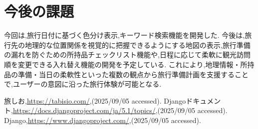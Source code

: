 \documentclass[a4j,twocolumn]{jsarticle}
\begin{document}
\section{今後の課題}
\label{sec:org5f7a81b}
今回は,旅行日付に基づく色分け表示,キーワード検索機能を開発した.
今後は,旅行先の地理的な位置関係を視覚的に把握できるようにする地図の表示,旅行準備の漏れを防ぐための所持品チェックリスト機能や,日程に応じて柔軟に観光訪問順を変更できる入れ替え機能の開発を予定している.
これにより,地理情報・所持品の準備・当日の柔軟性といった複数の観点から旅行準備計画を支援することで,ユーザーの意図に沿った旅行体験が可能となる.



\small\setlength\baselineskip{10pt}
\begin{thebibliography}{9}

 旅しお,\url{https://tabisio.com/},(2025/09/05 accessed).
Djangoドキュメント,\url{https://docs.djangoproject.com/ja/5.1/topics/},(2025/09/05 accessed).
Django,\url{https://www.djangoproject.com/},(2025/09/05 accessed).
\end{thebibliography}
\end{document}
